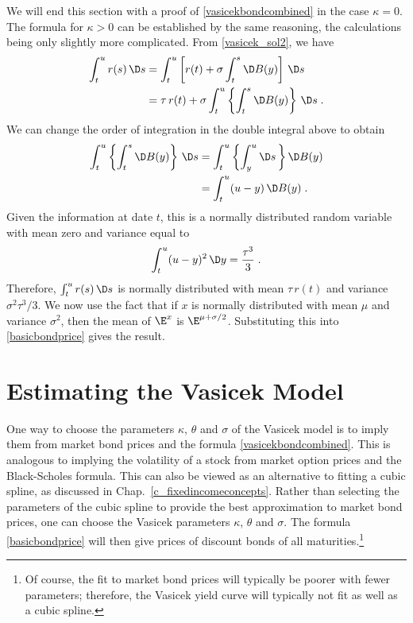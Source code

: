 \begin{petit}
We will end this section with a proof of \eqref{vasicekbondcombined} in the case $\kappa=0$.  The formula for $\kappa>0$ can be established by the same reasoning, the calculations being only slightly more complicated.
From  \eqref{vasicek_sol2}, we have
\begin{align*}
\int_t^u r(s)\,\D s & = \int_t^u \left[r(t)+\sigma \int_t^s \D B(y)\right]\,\D s\\
&=\tau\, r(t)+\sigma \int_t^u \left\{\int_t^s \D B(y) \right\} \,\D s\; .
\end{align*}
We can change the order of integration in the double integral above to obtain
\begin{align*}
\int_t^u \left\{\int_t^s \D B(y) \right\} \,\D s &=\int_t^u \left\{\int_y^u \D s\,\right\} \D B(y)\\
&=\int_t^u (u-y)\,\D B(y)\;.
\end{align*}
Given the information at date $t$, this is a normally distributed random variable with mean zero and variance equal to
$$\int_t^u (u-y)^2\,\D y = \frac{\tau^3}{3}\; .$$
Therefore, 
$\int_t^u r(s)\,\D s$
is normally distributed with mean  $\tau\, r(t)$ and variance $\sigma^2\tau^3/3$.  We now use the fact that if $x$ is normally distributed with mean $\mu$ and variance $\sigma^2$, then the mean of $\E^x$ is $\E^{\mu+\sigma/2}$.  Substituting this into  \eqref{basicbondprice} gives the result.
\end{petit}

\section{Estimating the Vasicek Model}

One way to choose the parameters $\kappa$, $\theta$ and $\sigma$ of the Vasicek model is to imply them from market bond prices and the formula \eqref{vasicekbondcombined}.  This is analogous to implying the volatility of a stock from market option prices and the Black-Scholes formula.  This can also be viewed as an alternative to fitting a cubic spline, as discussed in Chap.~\ref{c_fixedincomeconcepts}.  Rather than selecting the parameters of the cubic spline to provide the best approximation to market bond prices, one can choose the Vasicek parameters $\kappa$, $\theta$ and $\sigma$.  The formula \eqref{basicbondprice} will then give prices of discount bonds of all maturities.\footnote{Of course, the fit to market bond prices will typically be poorer with fewer parameters; therefore, the Vasicek yield curve will typically not fit as well as a cubic spline.}

